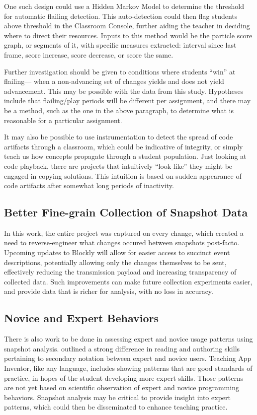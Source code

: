 One such design could use a Hidden Markov Model to determine the threshold for automatic flailing detection. This auto-detection could then flag students above threshold in the Classroom Console, further aiding the teacher in deciding where to direct their resources. Inputs to this method would be the particle score graph, or segments of it, with specific measures extracted: interval since last frame, score increase, score decrease, or score the same. 

Further investigation should be given to conditions where students ``win'' at flailing--- when a non-advancing set of changes yields and does not yield advancement. This may be possible with the data from this study. Hypotheses include that flailing/play periods will be different per assignment, and there may be a method, such as the one in the above paragraph, to determine what is reasonable for a particular assignment. 

It may also be possible to use instrumentation to detect the spread of code artifacts through a classroom, which could be indicative of integrity, or simply teach us how concepts propagate through a student population. Just looking at code playback, there are projects that intuitively ``look like'' they might be engaged in copying solutions. This intuition is based on sudden appearance of code artifacts after somewhat long periods of inactivity. 


\subsection{Better Fine-grain Collection of Snapshot Data} 
In this work, the entire project was captured on every change, which created a need to reverse-engineer what changes occured between snapshots post-facto. Upcoming updates to Blockly will allow for easier access to succinct event descriptions, potentially allowing only the changes themselves to be sent, effectively reducing the transmission payload and increasing transparency of collected data. Such improvements can make future collection experiments easier, and provide data that is richer for analysis, with no loss in accuracy. 

\subsection{Novice and Expert Behaviors}
There is also work to be done in assessing expert and novice usage patterns using snapshot analysis. \cite{petre-1995} outlined a strong difference in reading and authoring skills pertaining to secondary notation between expert and novice users. Teaching App Inventor, like any language, includes showing patterns that are good standards of practice, in hopes of the student developing more expert skills. Those patterns are not yet based on scientific observation of expert and novice programming behaviors. Snapshot analysis may be critical to provide insight into expert patterns, which could then be disseminated to enhance teaching practice. 

